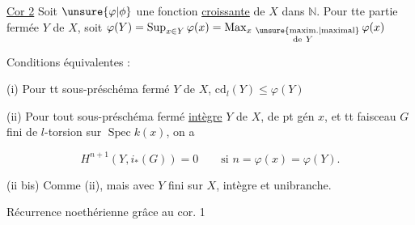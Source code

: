 
\uline{Cor 2} Soit $\unsure{\varphi|\phi}$ une fonction  \uline{croissante} de  $X$ dans $\mathbb N$.  Pour tte partie fermée $Y$ de $X$, soit $\varphi(Y)=\operatorname*{Sup}_{x\in Y}\varphi(x)=\operatorname*{Max}_{\substack{x\ \text{\unsure{maxim.|maximal}}\\\text{de}\ Y}}\varphi(x)$

Conditions équivalentes :

(i) Pour tt sous-préschéma fermé $Y$ de $X$, $\mathrm{cd}_l(Y)\leq\varphi(Y)$

(ii) Pour tout sous-préschéma fermé \uline{intègre} $Y$ de $X$, de pt gén $x$, et tt faisceau $G$ fini de $l$-torsion sur $\operatorname{Spec} k(x)$, on a

\[
H^{n+1}(Y,i_*(G))=0\qquad\text{si }n=\varphi(x)=\varphi(Y).
\]

(ii bis) Comme (ii), mais avec $Y$ fini sur $X$, intègre et unibranche.

Récurrence noethérienne grâce au cor. 1

 



